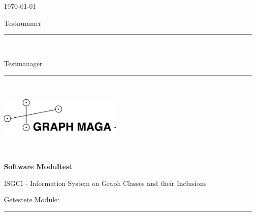 \documentclass[10pt,a4paper]{article}
\begin{document}
\thispagestyle{empty} %


\begin{minipage}[l]{0.6\textwidth}
{\large \today}\\

{\large Testnummer \rule{1cm}{0.4pt}}\\

{\large Testmanager \rule{4cm}{0.4pt}}\\

\end{minipage}
\begin{minipage}{0.4\textwidth}
\includegraphics*[width=6cm]{Logo.png}
\end{minipage}\\


\vspace*{1cm} 
\begin{center}
\textbf{{\LARGE Software Modultest}}\\
\end{center}

\begin{center}
{\large ISGCI - Information System on Graph Classes and their Inclusions}\\
\end{center}

\begin{center}
{\large Getestete Module: \rule{4cm}{0.4pt}}\\
\end{center}

$ $\\

	\hspace{1cm}
\\
	
\end{document}
